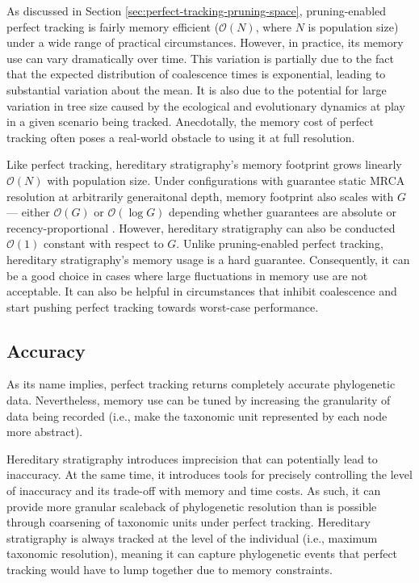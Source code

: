 As discussed in Section \ref{sec:perfect-tracking-pruning-space}, pruning-enabled perfect tracking is fairly memory efficient ($\mathcal{O}(N)$, where $N$ is population size) under a wide range of practical circumstances.
However, in practice, its memory use can vary dramatically over time.
This variation is partially due to the fact that the expected distribution of coalescence times is exponential, leading to substantial variation about the mean.
It is also due to the potential for large variation in tree size caused by the ecological and evolutionary dynamics at play in a given scenario being tracked.
Anecdotally, the memory cost of perfect tracking often poses a real-world obstacle to using it at full resolution.

Like perfect tracking, hereditary stratigraphy's memory footprint grows linearly $\mathcal{O}(N)$ with population size.
Under configurations with guarantee static MRCA resolution at arbitrarily generaitonal depth, memory footprint also scales with $G$ --- either $\mathcal{O}(G)$ or $\mathcal{O}(\log G)$ depending whether guarantees are absolute or recency-proportional \citep{OTHERPREPRINT}.  %
However, hereditary stratigraphy can also be conducted $\mathcal{O}(1)$ constant with respect to $G$.
Unlike pruning-enabled perfect tracking, hereditary stratigraphy's memory usage is a hard guarantee.
Consequently, it can be a good choice in cases where large fluctuations in memory use are not acceptable.
It can also be helpful in circumstances that inhibit coalescence and start pushing perfect tracking towards worst-case performance.

\subsection{Accuracy}

As its name implies, perfect tracking returns completely accurate phylogenetic data.
Nevertheless, memory use can be tuned by increasing the granularity of data being recorded (i.e., make the taxonomic unit represented by each node more abstract).

Hereditary stratigraphy introduces imprecision that can potentially lead to inaccuracy.
At the same time, it introduces tools for precisely controlling the level of inaccuracy and its trade-off with memory and time costs.
As such, it can provide more granular scaleback of phylogenetic resolution than is possible through coarsening of taxonomic units under perfect tracking.
Hereditary stratigraphy is always tracked at the level of the individual (i.e., maximum taxonomic resolution), meaning it can capture phylogenetic events that perfect tracking would have to lump together due to memory constraints.

